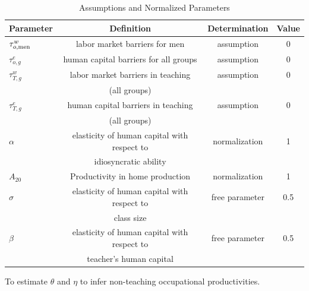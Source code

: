 \documentclass[onehalfspacing,11pt]{article}
\begin{document}
		\begin{table}[h!]
		\centering
		\small
		\begin{tabular}{lccc}
			\toprule
			Parameter & Definition & Determination & Value\\
			\midrule
			$\tau^{w}_{o,{\rm men}}$ & labor market barriers for men & assumption & 0 \\
			$\tau^{e}_{o,g}$ & human capital barriers for all groups & assumption & 0 \\
			$\tau^{w}_{T,g}$ & labor market barriers in teaching  & assumption & 0 \\
			& (all groups)&\\
			$\tau^{e}_{T,g}$ & human capital barriers in teaching & assumption & 0 \\
			& (all groups) & \\
			$\alpha$ & elasticity of human capital with respect to & normalization & 1 \\
			& idiosyncratic ability & \\
			$A_{20}$ & Productivity in home production & normalization & 1 \\
			\midrule
			$\sigma$ & elasticity of human capital with respect to & free parameter & 0.5 \\
			& class size & \\
			$\beta$ & elasticity of human capital with respect to & free parameter & 0.5\\
			& teacher's human capital & \\

			\bottomrule
		\end{tabular}
		\caption{Assumptions and Normalized Parameters}
		\label{tab:assump}
	\end{table}
	
	To estimate $\theta$ and $\eta$ to infer non-teaching occupational productivities.
	
\end{document}
